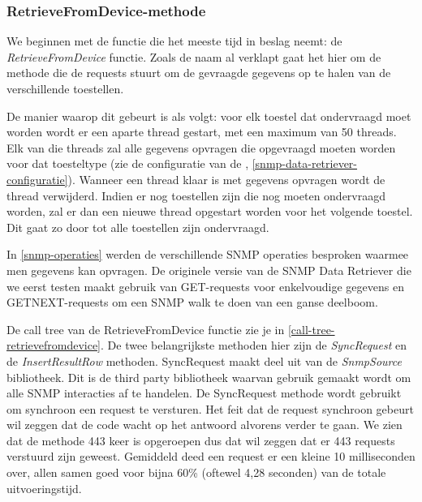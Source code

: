 \subsubsection{RetrieveFromDevice-methode}


We beginnen met de functie die het meeste tijd in beslag neemt: de \emph{RetrieveFromDevice} functie. %
Zoals de naam al verklapt gaat het hier om de methode die de requests stuurt om de gevraagde gegevens op te halen van de verschillende toestellen.

De manier waarop dit gebeurt is als volgt:
voor elk toestel dat ondervraagd moet worden wordt er een aparte thread gestart, met een maximum van 50 threads.
Elk van die threads zal alle gegevens opvragen die opgevraagd moeten worden voor dat toesteltype (zie de configuratie van de \nwmretriever, \cref{snmp-data-retriever-configuratie}).
Wanneer een thread klaar is met gegevens opvragen wordt de thread verwijderd.
Indien er nog toestellen zijn die nog moeten ondervraagd worden, zal er dan een nieuwe thread opgestart worden voor het volgende toestel. 
Dit gaat zo door tot alle toestellen zijn ondervraagd.

In \cref{snmp-operaties} werden de verschillende SNMP operaties besproken waarmee men
gegevens kan opvragen. De originele versie van de SNMP Data Retriever die we eerst testen maakt gebruik van
GET-requests voor enkelvoudige gegevens en GETNEXT-requests om een SNMP walk te doen van 
een ganse deelboom.

De call tree van de RetrieveFromDevice functie zie je in \cref{call-tree-retrievefromdevice}. %
De twee belangrijkste methoden hier zijn de \emph{SyncRequest} en de \emph{InsertResultRow} methoden. %
SyncRequest maakt deel uit van de \emph{SnmpSource} bibliotheek. %
Dit is de third party bibliotheek waarvan gebruik gemaakt wordt om alle SNMP interacties af te handelen. %
De SyncRequest methode wordt gebruikt om synchroon een request te versturen.
Het feit dat de request synchroon gebeurt wil zeggen dat de code wacht op het antwoord alvorens verder te gaan.
We zien dat de methode 443 keer is opgeroepen dus dat wil zeggen dat er 443 requests verstuurd zijn geweest.
Gemiddeld deed een request er een kleine 10 milliseconden over, allen samen goed voor bijna 60\% (oftewel 4,28 seconden) van de totale uitvoeringstijd.

